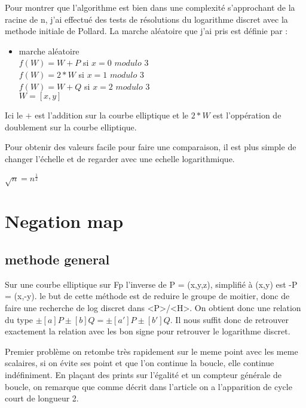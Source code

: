 \documentclass[a4paper,10pt]{report}
\begin{document}
Pour montrer que l'algorithme est bien dans une complexité s'approchant de la racine de n, j'ai effectué des tests de résolutions du logarithme discret avec la methode initiale
de Pollard. La marche aléatoire que j'ai pris est définie par : \\
\begin{itemize}
 \item {marche aléatoire}\\
  $ f(W) = W+P$ si $x = 0$ $modulo$ $3$ \\
  $ f(W) = 2*W$ si $x = 1$ $modulo$ $3$ \\
  $ f(W) = W+Q$ si $x = 2$  $modulo$ $3$ \\
  $ W = [x,y] $ \\
\end{itemize}

Ici le $+$ est l'addition sur la courbe elliptique et le $2*W$ est l'oppération de doublement sur la courbe elliptique.

Pour obtenir des valeurs facile pour faire une comparaison, il est plus simple de changer l'échelle et de regarder avec une echelle logarithmique.\\
\begin{center}
 $\sqrt{n} = n^{\frac{1}{2}}$
\end{center}



\chapter{Negation map}

\section{methode general}

Sur une courbe elliptique sur Fp l'inverse de P = (x,y,z), simplifié à (x,y) est -P = (x,-y). le but de cette méthode est de reduire le groupe de moitier,
donc de faire une recherche de log discret dans <P>/<H>. On obtient donc une relation du type $\pm[a]P \pm[b]Q = \pm[a']P \pm[b']Q$. Il nous suffit donc de retrouver exactement 
la relation avec les bon signe pour retrouver le logarithme discret.

Premier problème on retombe très rapidement sur le meme point avec les meme scalaires, si on évite ses point et que l'on continue la boucle, elle continue indéfiniment.
En plaçant des prints sur l'égalité et un compteur générale de boucle, on remarque que comme décrit dans l'article on a l'apparition de cycle court de longueur 2.
\end{document}

